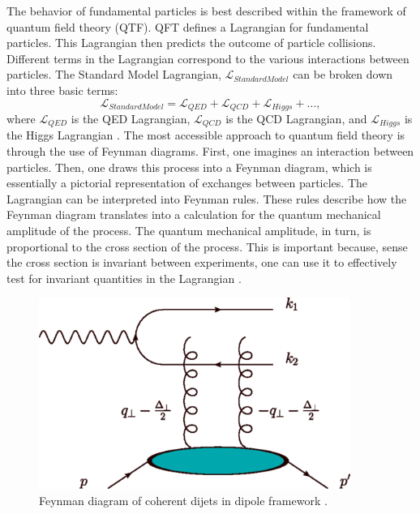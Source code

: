 The behavior of fundamental particles is best described within the framework of quantum field theory (QTF). QFT defines a Lagrangian for fundamental particles. This Lagrangian then predicts the outcome of particle collisions. Different terms in the Lagrangian correspond to the various interactions between particles. The Standard Model Lagrangian, $\mathcal{L}_{Standard Model}$ can be broken down into three basic terms:	
\begin{equation}
\mathcal{L}_{Standard Model} = \mathcal{L}_{QED} + \mathcal{L}_{QCD} + \mathcal{L}_{Higgs} + ... ,  
\end{equation} 
where $\mathcal{L}_{QED}$ is the QED Lagrangian, $\mathcal{L}_{QCD}$ is the QCD Lagrangian, and $\mathcal{L}_{Higgs}$ is the Higgs Lagrangian \cite{Halzen:1984mc}. The most accessible approach to quantum field theory is through the use of Feynman diagrams. First, one imagines an interaction between particles. Then, one draws this process into a Feynman diagram, which is essentially a pictorial representation of exchanges between particles. The Lagrangian can be interpreted into Feynman rules. These rules describe how the Feynman diagram translates into a calculation for the quantum mechanical amplitude of the process. The quantum mechanical amplitude, in turn, is proportional to the cross section of the process. This is important because, sense the cross section is invariant between experiments, one can use it to effectively test for invariant quantities in the Lagrangian \cite{Peskin:1995ev}. 

\begin{figure}[h!]
\begin{centering}
\includegraphics[width=4in]{Chapter1/importfigs/fig4_yatta.png}
\par\end{centering}
\caption{Feynman diagram of coherent dijets in dipole framework \cite{Hatta:2016dxp}.\label{fig:yatta1}}
\end{figure}

